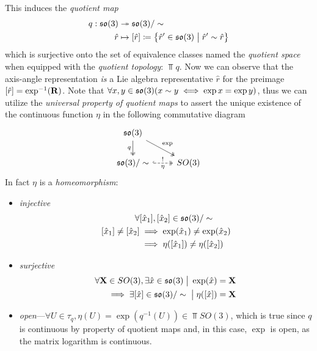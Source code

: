 \documentclass{amsart}
\theoremstyle{plain}
\theoremstyle{definition}
\begin{document}
    This induces the \emph{quotient map}
    \begin{align}
        q: \mathfrak{so}(3)&\twoheadrightarrow \mathfrak{so}(3)/\sim \\
        \hat{r} &\mapsto [\hat{r}] \coloneqq \left\{\hat{r}'\in\mathfrak{so}(3)\hspace{1mm}\big|\hspace{1mm} \hat{r}'\sim \hat{r}\right\}
    \end{align}
    which is surjective onto the set of equivalence classes named the \emph{quotient space} when equipped with the \emph{quotient topology}: $\Top{q}$. Now we can observe that the axis-angle representation \emph{is} a Lie algebra representative $\hat{r}$ for the preimage $\left[\hat{r}\right]=\exp^{-1}(\mathbf{R})$. Note that $\forall x,y\in \mathfrak{so}(3)(x\sim y\iff \exp{x}=\exp{y})$, thus we can utilize the \emph{universal property of quotient maps} to assert the unique existence of the continuous function $\eta$ in the following commutative diagram
    \begin{equation}
        \begin{tikzcd}
        \so(3) \arrow[d, two heads, "q"'] \arrow[rd, two heads, "\exp"] & \\
        \so(3)/\sim \arrow[r, dashed, hook, two heads, "!", "\eta"'] & SO(3)
        \end{tikzcd}
    \end{equation}
    In fact $\eta$ is a \emph{homeomorphism}:
    \begin{itemize}
        \item \emph{injective}\begin{align*}
            \forall&[\hat{x}_1],[\hat{x}_2]\in\mathfrak{so}(3)/\sim\\
            [\hat{x}_1]\neq [\hat{x}_2]&\implies \exp(\hat{x}_1)\neq \exp(\hat{x}_2)\\
            &\implies \eta([\hat{x}_1])\neq\eta([\hat{x}_2])
        \end{align*}
        \item \emph{surjective}\begin{align*}
            \forall \mathbf{X}\in SO(3), \exists \hat{x}\in\mathfrak{so}(3)\hspace{1mm}\big|\hspace{1mm} \exp(\hat{x})=\mathbf{X}\\
            \implies \exists [\hat{x}]\in\mathfrak{so}(3)/\sim\hspace{1mm}\big|\hspace{1mm} \eta([\hat{x}])=\mathbf{X}
        \end{align*}
        \item \emph{open}---$\forall U\in\tau_{q}, \eta(U) = \exp(q^{-1}(U))\in \Top{SO(3)}$, which is true since $q$ is continuous by property of quotient maps and, in this case, $\exp$ is open\cite[Thm. 2.8]{hall}, as the matrix logarithm is continuous.
    \end{itemize}
\end{document}
